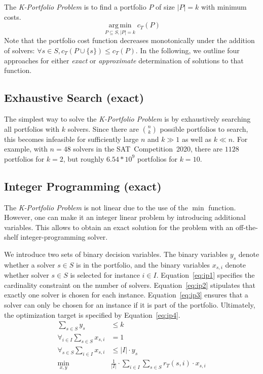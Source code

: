 \documentclass[conference]{IEEEtran}
\DeclareMathOperator*{\argmin}{arg\,min}
\begin{document}
The \emph{K-Portfolio Problem} is to find a portfolio $P$ of size $|P| = k$ with minimum costs.%
$$
\argmin\limits_{P \subseteq S, |P| = k} c_{T}(P)
$$
Note that the portfolio cost function decreases monotonically under the addition of solvers: $\forall s \in S, c_{T}(P \cup \{s\}) \leq c_{T}(P)$. 
In the following, we outline four approaches for either \emph{exact} or \emph{approximate} determination of solutions to that function. 

\subsection{Exhaustive Search (exact)}

The simplest way to solve the \emph{K-Portfolio Problem} is by exhaustively searching all portfolios with $k$ solvers. 
Since there are $\binom{n}{k}$ possible portfolios to search, this becomes infeasible for sufficiently large $n$ and $k \gg 1$ as well as $k \ll n$.
For example, with $n=48$ solvers in the SAT~Competition~2020, there are $1128$ portfolios for $k=2$, but roughly $6.54 * 10^9$ portfolios for $k=10$.

\subsection{Integer Programming (exact)}

The \emph{K-Portfolio Problem} is not linear due to the use of the $\min$ function.
However, one can make it an integer linear problem by introducing additional variables.
This allows to obtain an exact solution for the problem with an off-the-shelf integer-programming solver.

We introduce two sets of binary decision variables. 
The binary variables $y_s$ denote whether a solver $s \in S$ is in the portfolio, and 
the binary variables $x_{s,i}$ denote whether solver $s \in S$ is selected for instance $i \in I$. 
Equation~\ref{eq:ip1} specifies the cardinality constraint on the number of solvers. 
Equation~\ref{eq:ip2} stipulates that exactly one solver is chosen for each instance. 
Equation~\ref{eq:ip3} ensures that a solver can only be chosen for an instance if it is part of the portfolio. 
Ultimately, the optimization target is specified by Equation~\ref{eq:ip4}.%
\begin{align}
	\sum_{s \in S} y_s &\leq k \label{eq:ip1}\\
	\forall_{i\in I} \sum_{s \in S} x_{s,i} &= 1 \label{eq:ip2}\\
	\forall_{s \in S} \sum_{i \in I} x_{s,i} &\leq |I| \cdot y_s \label{eq:ip3}\\
	\min_{x,y} \quad & \frac{1}{|I|} \cdot \sum_{i \in I} \sum_{s \in S} r_T(s,i) \cdot x_{s,i} \label{eq:ip4}
\end{align}
\end{document}
